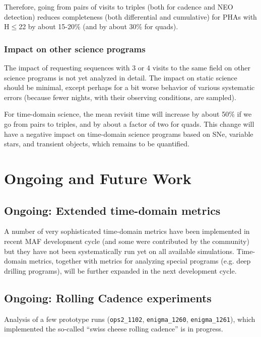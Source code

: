 Therefore, going from pairs of visits to triples (both for cadence and
NEO detection) reduces completeness (both differential and cumulative)
for PHAs with H$\le$22 by about 15-20\% (and by about 30\% for quads).


\subsubsection{Impact on other science programs}

The impact of requesting sequences with 3 or 4 visits to the same
field on other science programs is not yet analyzed in detail.  The
impact on static science should be minimal, except perhaps for a bit
worse behavior of various systematic errors (because fewer nights,
with their observing conditions, are sampled).

For time-domain science, the mean revisit time will increase by about
50\% if we go from pairs to triples, and by about a factor of two for
quads. This change will have a negative impact on time-domain science
programs based on SNe, variable stars, and transient objects, which
remains to be quantified.

\navigationbar


\section{Ongoing and Future Work}
\def\secname{cadexp:ongoing}\label{sec:\secname}


\subsection{Ongoing: Extended time-domain metrics}

A number of very sophisticated time-domain metrics have been
implemented in recent MAF development cycle (and some were contributed
by the community) but they have not been systematically run yet on all
available simulations. Time-domain metrics, together with metrics for
analyzing special programs (e.g. deep drilling programs), will be
further expanded in the next development cycle.


\subsection{Ongoing: Rolling Cadence experiments}

Analysis of a few prototype runs (\texttt{ops2\_1102},
\texttt{enigma\_1260}, \texttt{enigma\_1261}), which implemented the
so-called ``swiss cheese rolling cadence'' is in progress.


